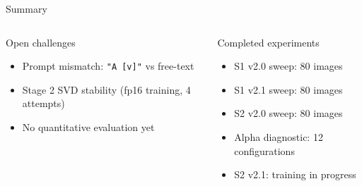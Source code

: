\documentclass[aspectratio=169,10pt]{beamer}
\begin{document}
\begin{frame}[shrink=10]{Summary}
\begin{columns}[T]
      \begin{alertblock}{Open challenges}
        \begin{itemize}
          \item Prompt mismatch: \texttt{"A [v]"} vs free-text
          \item Stage 2 SVD stability (fp16 training, 4 attempts)
          \item No quantitative evaluation yet
        \end{itemize}
      \end{alertblock}
      \vspace{0.5em}
      \begin{block}{Completed experiments}
        \begin{itemize}
          \item[$\checkmark$] S1 v2.0 sweep: 80 images
          \item[$\checkmark$] S1 v2.1 sweep: 80 images
          \item[$\checkmark$] S2 v2.0 sweep: 80 images
          \item[$\checkmark$] Alpha diagnostic: 12 configurations
          \item[\ldots] S2 v2.1: training in progress
        \end{itemize}
      \end{block}
  \end{columns}
\end{frame}

\appendix
\end{document}
